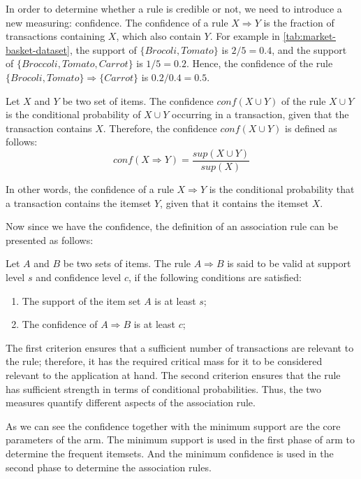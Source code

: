 In order to determine whether a rule is credible or not, we need to introduce a new measuring: confidence.
The confidence of a rule $X \Rightarrow Y$ is the fraction of transactions containing $X$, which also contain $Y$.
For example in \autoref{tab:market-basket-dataset}, the support of $\{Brocoli, Tomato\}$ is $2/5=0.4$, and the support of $\{Broccoli, Tomato, Carrot\}$ is $1/5=0.2$.
Hence, the confidence of the rule $\{Brocoli, Tomato\} \Rightarrow \{Carrot\}$ is $0.2 / 0.4 = 0.5$.
\begin{definition}
    Let $X$ and $Y$ be two set of items.
    The confidence $conf(X \cup Y)$ of the rule $X \cup Y$ is the conditional probability of $X \cup Y$ occurring in a transaction, given that the transaction contains $X$.
    Therefore, the confidence $conf(X \cup Y)$ is defined as follows:
    \begin{equation}
        conf(X \Rightarrow Y) = \frac{sup(X \cup Y)}{sup(X)}
    \end{equation}
\end{definition}
In other words, the confidence of a rule $X \Rightarrow Y$ is the conditional probability that a transaction contains the itemset $Y$, given that it contains the itemset $X$.

Now since we have the confidence, the definition of an association rule can be presented as follows:
\begin{definition}
    Let $A$ and $B$ be two sets of items.
    The rule $A \Rightarrow B$ is said to be valid at support level $s$ and confidence level $c$, if the following conditions are satisfied:
    \begin{enumerate}
        \item The support of the item set $A$ is at least $s$;
        \item The confidence of $A \Rightarrow B$ is at least $c$;
    \end{enumerate}
    The first criterion ensures that a sufficient number of transactions are relevant to the rule; therefore, it has the required critical mass for it to be considered relevant to the application at hand.
    The second criterion ensures that the rule has sufficient strength in terms of conditional probabilities.
    Thus, the two measures quantify different aspects of the association rule.
\end{definition}
As we can see the confidence together with the minimum support are the core parameters of the \acl{arm}.
The minimum support is used in the first phase of \acl{arm} to determine the frequent itemsets.
And the minimum confidence is used in the second phase to determine the association rules.

